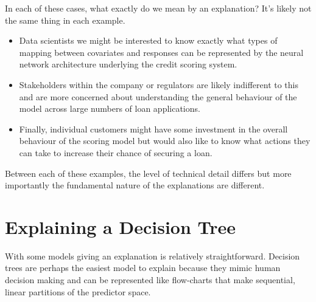 \documentclass[
  letterpaper,
  DIV=11,
  numbers=noendperiod]{scrreprt}
\begin{document}
In each of these cases, what exactly do we mean by an explanation? It's
likely not the same thing in each example.

\begin{itemize}
\item
  Data scientists we might be interested to know exactly what types of
  mapping between covariates and responses can be represented by the
  neural network architecture underlying the credit scoring system.
\item
  Stakeholders within the company or regulators are likely indifferent
  to this and are more concerned about understanding the general
  behaviour of the model across large numbers of loan applications.
\item
  Finally, individual customers might have some investment in the
  overall behaviour of the scoring model but would also like to know
  what actions they can take to increase their chance of securing a
  loan.
\end{itemize}

Between each of these examples, the level of technical detail differs
but more importantly the fundamental nature of the explanations are
different.

\section{Explaining a Decision Tree}\label{explaining-a-decision-tree}

With some models giving an explanation is relatively straightforward.
Decision trees are perhaps the easiest model to explain because they
mimic human decision making and can be represented like flow-charts that
make sequential, linear partitions of the predictor space.
\end{document}
